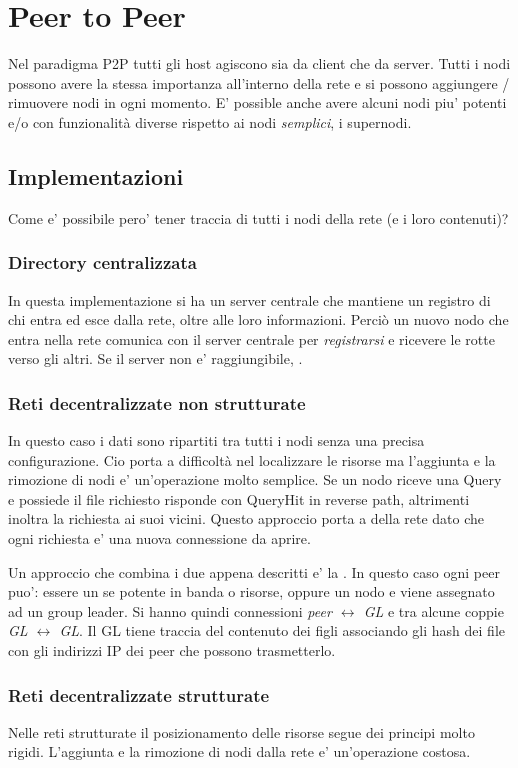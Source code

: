 \chapter{Peer to Peer}
Nel paradigma P2P tutti gli host agiscono sia da client che da server.
Tutti i nodi possono avere la stessa importanza all'interno della rete e si possono aggiungere / rimuovere nodi in ogni momento.
E' possible anche avere alcuni nodi piu' potenti e/o con funzionalità diverse rispetto ai nodi \textit{semplici}, i supernodi.
\section{Implementazioni}
Come e' possibile pero' tener traccia di tutti i nodi della rete (e i loro contenuti)?
\subsection{Directory centralizzata}
In questa implementazione si ha un server centrale che mantiene un registro di chi entra ed esce dalla rete, oltre alle loro informazioni.
Perciò un nuovo nodo che entra nella rete comunica con il server centrale per \textit{registrarsi} e ricevere le rotte verso gli altri.
Se il server non e' raggiungibile, .
\subsection{Reti decentralizzate non strutturate}
In questo caso i dati sono ripartiti tra tutti i nodi senza una precisa configurazione. Cio porta a difficoltà nel localizzare le risorse ma l'aggiunta e la rimozione di nodi e' un'operazione molto semplice.
Se un nodo riceve una Query e possiede il file richiesto risponde con QueryHit in reverse path, altrimenti inoltra la richiesta ai suoi vicini.
Questo approccio porta a  della rete dato che ogni richiesta e' una nuova connessione da aprire.

Un approccio che combina i due appena descritti e' la .
In questo caso ogni peer puo': essere un  se potente in banda o risorse, oppure un nodo  e viene assegnato ad un group leader.
Si hanno quindi connessioni \textit{peer $\leftrightarrow$ GL} e tra alcune coppie \textit{GL $\leftrightarrow$ GL}.
Il GL tiene traccia del contenuto dei figli associando gli hash dei file con gli indirizzi IP dei peer che possono trasmetterlo.
\subsection{Reti decentralizzate strutturate}
Nelle reti strutturate il posizionamento delle risorse segue dei principi molto rigidi. L'aggiunta e la rimozione di nodi dalla rete e' un'operazione costosa.

